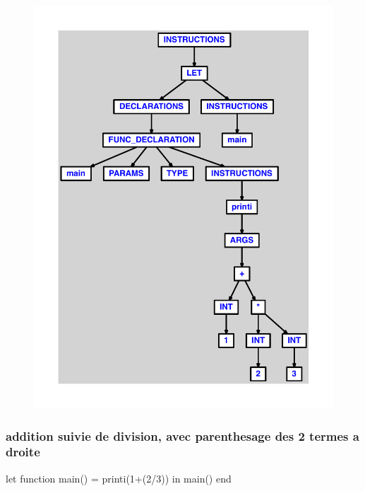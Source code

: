 \documentclass{article}
\begin{document}
\begin{figure}[H]\centering\includegraphics[max width=\textwidth]{ast/ast_89.pdf}\end{figure}\subsubsection{addition suivie de division, avec parenthesage des 2 termes a droite}
\begin{verbatimtab}
let function main() = printi(1+(2/3)) in main() end
\end{verbatimtab}
\end{document}
